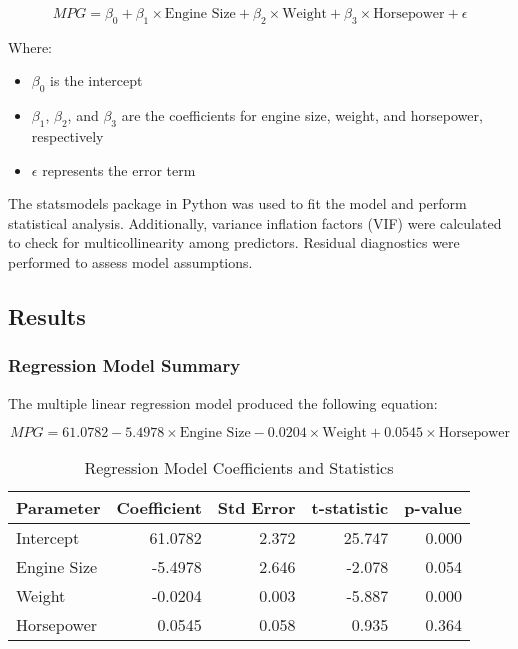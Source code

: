 \documentclass[12pt]{article}
\begin{document}
\begin{equation}
MPG = \beta_0 + \beta_1 \times \text{Engine Size} + \beta_2 \times \text{Weight} + \beta_3 \times \text{Horsepower} + \epsilon
\end{equation}

Where:
\begin{itemize}
    \item $\beta_0$ is the intercept
    \item $\beta_1$, $\beta_2$, and $\beta_3$ are the coefficients for engine size, weight, and horsepower, respectively
    \item $\epsilon$ represents the error term
\end{itemize}

The statsmodels package in Python was used to fit the model and perform statistical analysis. Additionally, variance inflation factors (VIF) were calculated to check for multicollinearity among predictors. Residual diagnostics were performed to assess model assumptions.

\subsection{Results}

\subsubsection{Regression Model Summary}
The multiple linear regression model produced the following equation:

\begin{equation}
MPG = 61.0782 - 5.4978 \times \text{Engine Size} - 0.0204 \times \text{Weight} + 0.0545 \times \text{Horsepower}
\end{equation}

\begin{table}[H]
\centering
\caption{Regression Model Coefficients and Statistics}
\begin{tabular}{lrrrr}
\toprule
Parameter & Coefficient & Std Error & t-statistic & p-value \\
\midrule
Intercept & 61.0782 & 2.372 & 25.747 & 0.000 \\
Engine Size & -5.4978 & 2.646 & -2.078 & 0.054 \\
Weight & -0.0204 & 0.003 & -5.887 & 0.000 \\
Horsepower & 0.0545 & 0.058 & 0.935 & 0.364 \\
\bottomrule
\end{tabular}
\end{table}
\end{document}
